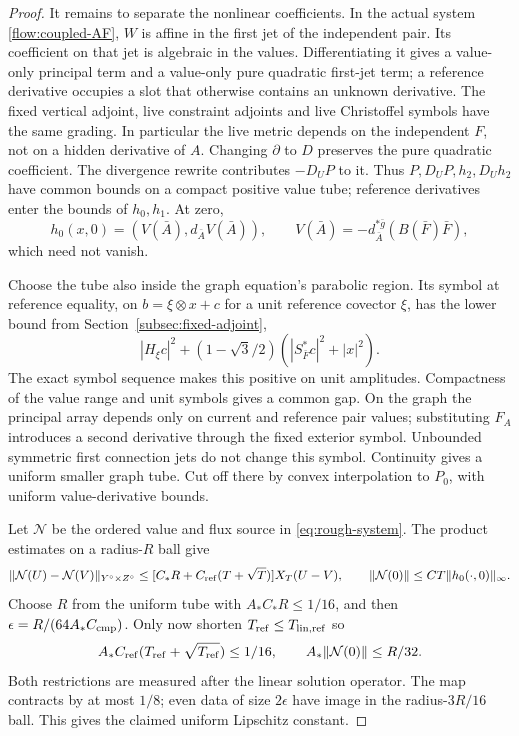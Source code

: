\documentclass[11pt]{article}
\numberwithin{equation}{section}
\theoremstyle{definition}
\theoremstyle{remark}
\begin{document}
\begin{proof}
It remains to separate the nonlinear coefficients.
In the actual system \eqref{flow:coupled-AF}, \(W\)
is affine in the first jet of the independent pair.
Its coefficient on that jet is algebraic in the values.
Differentiating it gives a value-only principal term
and a value-only pure quadratic first-jet term; a
reference derivative occupies a slot that otherwise
contains an unknown derivative. The fixed vertical
adjoint, live constraint adjoints and live Christoffel
symbols have the same grading. In particular the live
metric depends on the independent \(F\), not on a
hidden derivative of \(A\). Changing \(\partial\) to
\(D\) preserves the pure quadratic coefficient.
The divergence rewrite contributes \(-D_UP\) to it.
Thus \(P,D_UP,h_2,D_Uh_2\) have common bounds on a
compact positive value tube; reference derivatives
enter the bounds of \(h_0,h_1\). At zero,
\[
 h_0(x,0)=(V(\bar A),d_{\bar A}V(\bar A)),\qquad
 V(\bar A)=-d_{\bar A}^{*\bar g}(B(\bar F)\bar F),
\]
which need not vanish.

Choose the tube also inside the graph equation's
parabolic region. Its symbol at reference equality,
on \(b=\xi\otimes x+c\) for a unit reference covector
\(\xi\), has the lower bound from
Section~\ref{subsec:fixed-adjoint},
\[
 |H_\xi c|^2+(1-\sqrt3/2)
                  (|S_{\bar F}^*c|^2+|x|^2).
\]
The exact symbol sequence makes this positive on
unit amplitudes. Compactness of the value range and
unit symbols gives a common gap. On the graph the
principal array depends only on current and reference
pair values; substituting \(F_A\) introduces a second
derivative through the fixed exterior symbol.
Unbounded symmetric first connection jets do not
change this symbol. Continuity gives a uniform
smaller graph tube. Cut off there by convex interpolation
to \(P_0\), with uniform value-derivative bounds.

Let \(\mathcal N\) be the ordered value and flux
source in \eqref{eq:rough-system}. The product estimates
on a radius-\(R\) ball give
\[
 \|\mathcal N(U)-\mathcal N(V)\|_{Y^\circ\times Z^\circ}
 \le [C_*R+C_{\rm ref}(T+\sqrt T)]X_T(U-V),
 \qquad
 \|\mathcal N(0)\|\le CT\|h_0(\cdot,0)\|_\infty .
\]
Choose \(R\) from the uniform tube with
\(A_*C_*R\le1/16\), and then
\(\epsilon=R/(64A_*C_{\rm cmp})\).
Only now shorten \(T_{\rm ref}\le T_{\rm lin,ref}\) so
\[
 A_*C_{\rm ref}(T_{\rm ref}+\sqrt{T_{\rm ref}})\le1/16,
 \qquad A_*\|\mathcal N(0)\|\le R/32.
\]
Both restrictions are measured after the linear solution operator.
The map contracts by at most \(1/8\); even data of
size \(2\epsilon\) have image in the radius-\(3R/16\)
ball. This gives the claimed uniform Lipschitz constant.


\end{proof}
\end{document}

